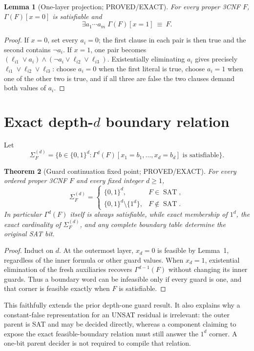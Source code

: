 \documentclass[11pt]{article}
\newtheorem{theorem}{Theorem}
\newtheorem{lemma}[theorem]{Lemma}
\newcommand{\SAT}{\operatorname{SAT}}
\newcommand{\Gam}{\Gamma}
\begin{document}
\begin{lemma}[One-layer projection; PROVED/EXACT]
For every proper 3CNF $F$, $\Gam(F)[x=0]$ is satisfiable and
\[
 \exists a_1\cdots a_m\;\Gam(F)[x=1]\ \equiv\ F.                 \tag{2}
\]
\end{lemma}
\begin{proof}
If $x=0$, set every $a_i=0$; the first clause in each pair is then true and
the second contains $\neg a_i$.  If $x=1$, one pair becomes
$(\ell_{i1}\vee a_i)\wedge(\neg a_i\vee\ell_{i2}\vee\ell_{i3})$.
Existentially eliminating $a_i$ gives precisely
$\ell_{i1}\vee\ell_{i2}\vee\ell_{i3}$: choose $a_i=0$ when the first
literal is true, choose $a_i=1$ when one of the other two is true, and if
all three are false the two clauses demand both values of $a_i$.
\end{proof}

\section{Exact depth-$d$ boundary relation}
Let
\[
 \Sigma_F^{(d)}=\{b\in\{0,1\}^d:
   \Gam^d(F)[x_1=b_1,\ldots,x_d=b_d]\text{ is satisfiable}\}.
\]

\begin{theorem}[Guard continuation fixed point; PROVED/EXACT]
For every ordered proper 3CNF $F$ and every fixed integer $d\ge1$,
\[
 \Sigma_F^{(d)}=
 \begin{cases}
  \{0,1\}^d,&F\in\SAT,\\
  \{0,1\}^d\setminus\{1^d\},&F\notin\SAT.
 \end{cases}                                                     \tag{3}
\]
In particular $\Gam^d(F)$ itself is always satisfiable, while exact
membership of $1^d$, the exact cardinality of $\Sigma_F^{(d)}$, and any
complete boundary table determine the original SAT bit.
\end{theorem}
\begin{proof}
Induct on $d$.  At the outermost layer, $x_d=0$ is feasible by Lemma~1,
regardless of the inner formula or other guard values.  When $x_d=1$,
existential elimination of the fresh auxiliaries recovers
$\Gam^{d-1}(F)$ without changing its inner guards.  Thus a boundary word
can be infeasible only if every guard is one, and that corner is feasible
exactly when $F$ is satisfiable.
\end{proof}

This faithfully extends the prior depth-one guard result.  It also explains
why a constant-false representation for an UNSAT residual is irrelevant:
the outer parent is SAT and may be decided directly, whereas a component
claiming to expose the exact feasible-boundary relation must still answer
the $1^d$ corner.  A one-bit parent decider is not required to compile that
relation.
\end{document}
